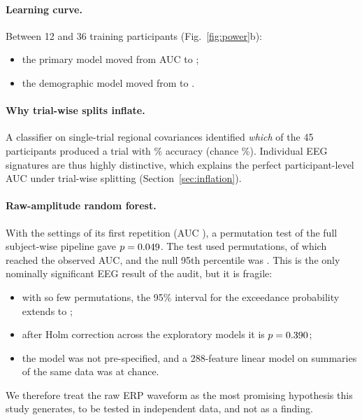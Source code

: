 \paragraph{Learning curve.} Between 12 and 36 training participants (Fig.~\ref{fig:power}b):
\begin{itemize}
  \item the primary model moved from AUC \AudLcPrimMin{} to \AudLcPrimMax;
  \item the demographic model moved from \AudLcDemoMin{} to \AudLcDemoMax.
\end{itemize}

\paragraph{Why trial-wise splits inflate.} A classifier on single-trial regional covariances identified \emph{which}
of the 45 participants produced a trial with \AudIdentAcc\% accuracy (chance \AudIdentChance\%). Individual EEG
signatures are thus highly distinctive, which explains the perfect participant-level AUC under trial-wise splitting
(Section~\ref{sec:inflation}).

\paragraph{Raw-amplitude random forest.} With the settings of its first repetition (AUC \AudRawRfObs), a permutation
test of the full subject-wise pipeline gave $p=0.049$. The test used \AudRawRfN{} permutations, of which
\AudRawRfExceed{} reached the observed AUC, and the null 95th percentile was \AudRawRfQ. This is the only nominally
significant EEG result of the audit, but it is fragile:
\begin{itemize}
  \item with so few permutations, the 95\% interval for the exceedance probability extends to \AudRawRfPciHi;
  \item after Holm correction across the \AudRawRfFamily{} exploratory models it is $p=0.390$;
  \item the model was not pre-specified, and a 288-feature linear model on summaries of the same data was at chance.
\end{itemize}
We therefore treat the raw ERP waveform as the most promising hypothesis this study generates, to be tested in
independent data, and not as a finding.

\begin{table}[t]
\centering\scriptsize
\setlength{\tabcolsep}{3pt}
\caption{Exploratory post-hoc models (D6), on the same folds as Table~\ref{tab:main}. $p_\text{perm}$: 1{,}000
permutations of the full nested pipeline. For the two incremental models the EEG block is permuted instead of the
labels. $p_\text{Holm}$ is computed across these seven models. $\Delta$AUC is the difference from the demographic
baseline, with the corrected resampled $t$-test.}
\label{tab:audit}

\end{table}

